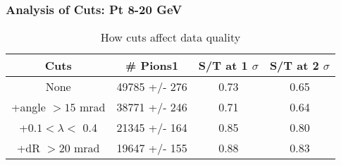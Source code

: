 \frame
{
\frametitle{Analysis of Cuts: Pt 8-20 GeV}
\begin{table}
\caption{How cuts affect data quality}
\centering
\begin{tabular}{c c c c}
\hline\hline
Cuts & \# Pions1 & S/T at 1 $\sigma$ & S/T at 2 $\sigma$ \\ [0.5ex]
\hline
None & 49785 +/-  276 & 0.73 & 0.65 \\ %
+angle $> 15$ mrad & 38771 +/-  246 & 0.71 & 0.64 \\ %
+$0.1 < \lambda <$ 0.4 & 21345 +/-  164 & 0.85 & 0.80 \\ %
+dR $> 20$ mrad & 19647 +/-  155 & 0.88 & 0.83 \\ %
[1ex]
\hline
\end{tabular}
\label{table:nonlin}
\end{table}
}

